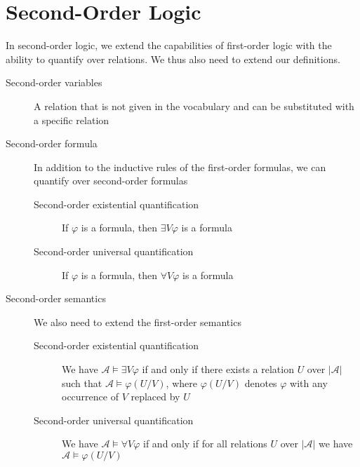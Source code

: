 \section{Second-Order Logic}\label{sec:second-order-logic}
In second-order logic, we extend the capabilities of first-order logic with the ability to quantify over relations.
We thus also need to extend our definitions.
\begin{description}
    \item[Second-order variables] A relation that is not given in the vocabulary and can be substituted with a specific relation
    \item[Second-order formula] In addition to the inductive rules of the first-order formulas, we can quantify over second-order formulas
    \begin{description}
        \item[Second-order existential quantification] If $\varphi$ is a formula, then $\exists V\varphi$ is a formula
        \item[Second-order universal quantification] If $\varphi$ is a formula, then $\forall V\varphi$ is a formula
    \end{description}
    \item[Second-order semantics] We also need to extend the first-order semantics
    \begin{description}
        \item[Second-order existential quantification]  We have $\mathcal{A} \models \exists V\varphi$ if and only if there exists a relation $U$ over $|\mathcal{A}|$ such that $\mathcal{A} \models \varphi(U / V)$, where $\varphi(U / V)$ denotes $\varphi$ with any occurrence of $V$ replaced by $U$
        \item[Second-order universal quantification] We have $\mathcal{A} \models \forall V\varphi$ if and only if for all relations $U$ over $|\mathcal{A}|$ we have $\mathcal{A} \models \varphi(U / V)$
    \end{description}
\end{description}


